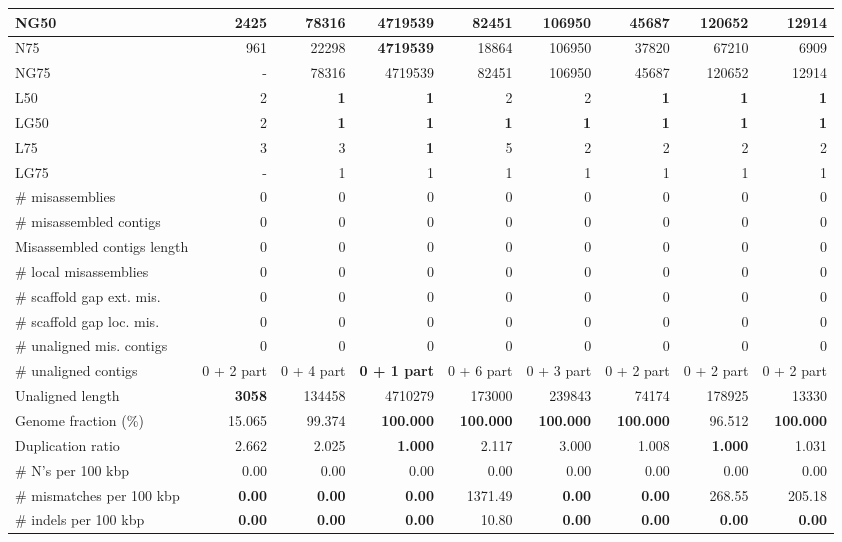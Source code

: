 \documentclass[12pt,a4paper]{article}
\begin{document}
\begin{table}[ht]
\begin{center}
\begin{tabular}{|l*{8}{|r}|}
NG50 & 2425 & 78316 & {\bf 4719539} & 82451 & 106950 & 45687 & 120652 & 12914 \\ \hline
N75 & 961 & 22298 & {\bf 4719539} & 18864 & 106950 & 37820 & 67210 & 6909 \\ \hline
NG75 & - & 78316 & 4719539 & 82451 & 106950 & 45687 & 120652 & 12914 \\ \hline
L50 & 2 & {\bf 1} & {\bf 1} & 2 & 2 & {\bf 1} & {\bf 1} & {\bf 1} \\ \hline
LG50 & 2 & {\bf 1} & {\bf 1} & {\bf 1} & {\bf 1} & {\bf 1} & {\bf 1} & {\bf 1} \\ \hline
L75 & 3 & 3 & {\bf 1} & 5 & 2 & 2 & 2 & 2 \\ \hline
LG75 & - & 1 & 1 & 1 & 1 & 1 & 1 & 1 \\ \hline
\# misassemblies & 0 & 0 & 0 & 0 & 0 & 0 & 0 & 0 \\ \hline
\# misassembled contigs & 0 & 0 & 0 & 0 & 0 & 0 & 0 & 0 \\ \hline
Misassembled contigs length & 0 & 0 & 0 & 0 & 0 & 0 & 0 & 0 \\ \hline
\# local misassemblies & 0 & 0 & 0 & 0 & 0 & 0 & 0 & 0 \\ \hline
\# scaffold gap ext. mis. & 0 & 0 & 0 & 0 & 0 & 0 & 0 & 0 \\ \hline
\# scaffold gap loc. mis. & 0 & 0 & 0 & 0 & 0 & 0 & 0 & 0 \\ \hline
\# unaligned mis. contigs & 0 & 0 & 0 & 0 & 0 & 0 & 0 & 0 \\ \hline
\# unaligned contigs & 0 + 2 part & 0 + 4 part & {\bf 0 + 1 part} & 0 + 6 part & 0 + 3 part & 0 + 2 part & 0 + 2 part & 0 + 2 part \\ \hline
Unaligned length & {\bf 3058} & 134458 & 4710279 & 173000 & 239843 & 74174 & 178925 & 13330 \\ \hline
Genome fraction (\%) & 15.065 & 99.374 & {\bf 100.000} & {\bf 100.000} & {\bf 100.000} & {\bf 100.000} & 96.512 & {\bf 100.000} \\ \hline
Duplication ratio & 2.662 & 2.025 & {\bf 1.000} & 2.117 & 3.000 & 1.008 & {\bf 1.000} & 1.031 \\ \hline
\# N's per 100 kbp & 0.00 & 0.00 & 0.00 & 0.00 & 0.00 & 0.00 & 0.00 & 0.00 \\ \hline
\# mismatches per 100 kbp & {\bf 0.00} & {\bf 0.00} & {\bf 0.00} & 1371.49 & {\bf 0.00} & {\bf 0.00} & 268.55 & 205.18 \\ \hline
\# indels per 100 kbp & {\bf 0.00} & {\bf 0.00} & {\bf 0.00} & 10.80 & {\bf 0.00} & {\bf 0.00} & {\bf 0.00} & {\bf 0.00} \\ \hline

\end{tabular}
\end{center}
\end{table}
\end{document}
